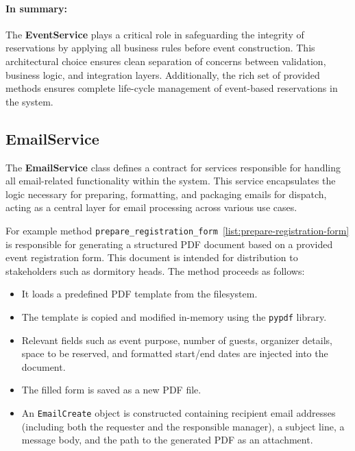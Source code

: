 \paragraph{In summary:} 
The \textbf{EventService} plays a critical role in safeguarding the integrity of reservations by applying all business rules before event construction. This architectural choice ensures clean separation of concerns between validation, business logic, and integration layers. Additionally, the rich set of provided methods ensures complete life-cycle management of event-based reservations in the system.

\newpage
\subsection{EmailService}

The \textbf{EmailService} class defines a contract for services responsible for handling all email-related functionality within the system. This service encapsulates the logic necessary for preparing, formatting, and packaging emails for dispatch, acting as a central layer for email processing across various use cases.

For example method \texttt{prepare\_registration\_form}~\ref{list:prepare-registration-form} is responsible for generating a structured PDF document based on a provided event registration form. This document is intended for distribution to stakeholders such as dormitory heads. The method proceeds as follows:
\begin{itemize}
    \item It loads a predefined PDF template from the filesystem.
    \item The template is copied and modified in-memory using the \texttt{pypdf} library.
    \item Relevant fields such as event purpose, number of guests, organizer details, space to be reserved, and formatted start/end dates are injected into the document.
    \item The filled form is saved as a new PDF file.
    \item An \texttt{EmailCreate} object is constructed containing recipient email addresses (including both the requester and the responsible manager), a subject line, a message body, and the path to the generated PDF as an attachment.
\end{itemize}

